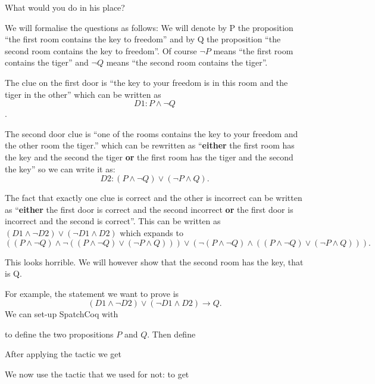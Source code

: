 What would you do in his place?

We will formalise the questions as follows: We will denote by P the proposition  ``the first room contains the key to freedom'' and by Q the proposition ``the second room contains the key to freedom''. Of course $\neg P$ means ``the first room contains the tiger'' and  $\neg Q$ means ``the second room contains the tiger''.

The clue on the first door is ``the key to your freedom  is in this room and the tiger in the other'' which can be written as $$D1:P\land \neg Q$$.

The second door clue is ``one of the rooms contains  the key to your freedom and the other room the tiger.'' which can be rewritten as ``{\bf either} the first room has the key and the second the tiger {\bf or} the first room has the tiger and the second the key'' so we can write it as:
 $$D2 : (P\land \neg Q) \lor (\neg P \land Q).$$ 
 
 The fact that exactly one clue is correct and the other is incorrect can be written as ``{\bf either} the first door is correct and the second incorrect {\bf or} the first door is incorrect and the second is correct''. This can be written as $(D1 \land \neg D2 )\lor (\neg D1 \land D2)$ which expands to $$((P\land \neg Q)\land \neg ((P\land \neg Q) \lor (\neg P \land Q)))\lor (\neg(P\land \neg Q) \land ((P\land \neg Q) \lor (\neg P \land Q))).$$ 

This looks horrible. We will however show that the second room has the key, that is Q.


For example, the statement we want to prove is 
$$(D1 \land \neg D2 )\lor (\neg D1 \land D2)\rightarrow Q.$$ 
We can set-up SpatchCoq with


to define the two propositions $P$ and $Q$.
Then define 



After applying the tactic 
 we get

We now use the tactic that we used for not:
to get


